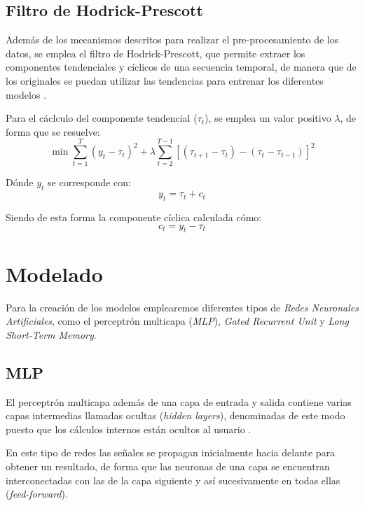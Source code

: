 \subsection{Filtro de Hodrick-Prescott}
Además de los mecanismos descritos para realizar el pre-procesamiento de los datos, se emplea el filtro de Hodrick-Prescott, que 
permite extraer los componentes tendenciales y cíclicos de una secuencia temporal, de manera que de los originales se 
puedan utilizar las tendencias para entrenar los diferentes modelos \cite{misc:wikipediaHP}.

Para el cáclculo del componente tendencial (\(\tau_t\)), se emplea un valor positivo \(\lambda\), de forma que se resuelve:
\begin{equation}
    \min \sum_{t=1}^T\left(y_t-\tau_t\right)^2+\lambda \sum_{t=2}^{T-1}\left[\left(\tau_{t+1}-\tau_t\right)-\left(\tau_t-\tau_{t-1}\right)\right]^2
\end{equation}

Dónde \(y_t\) se corresponde con:
\begin{equation}
    y_t = \tau_t + c_t
\end{equation}

Siendo de esta forma la componente cíclica calculada cómo:
\begin{equation}
    c_t = y_t - \tau_t
\end{equation}

\section{Modelado}

Para la creación de los modelos emplearemos diferentes tipos de \textit{Redes Neuronales Artificiales}, como 
el perceptrón multicapa (\textit{MLP}), \textit{Gated Recurrent Unit} y \textit{Long Short-Term Memory}.

\subsection{MLP}
El perceptrón multicapa además de una capa de entrada y salida contiene varias capas intermedias
llamadas ocultas (\textit{hidden layers}), denominadas de este modo puesto que los cálculos
internos están ocultos al usuario \cite{book:aggarwal2018}.

En este tipo de redes las señales se propagan inicialmente hacia delante para obtener un resultado, 
de forma que las neuronas de una capa se encuentran interconectadas con las de la capa
siguiente y así sucesivamente en todas ellas (\textit{feed-forward}).

